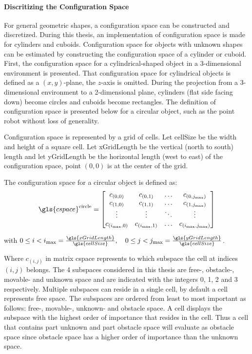 \paragraph{Discritizing the Configuration Space}
For general geometric shapes, a configuration space can be constructed and discretized. During this thesis, an implementation of configuration space is made for cylinders and cuboids. Configuration space for objects with unknown shapes can be estimated by constructing the configuration space of a cylinder or cuboid. First, the configuration space for a cylindrical-shaped object in a 3-dimensional environment is presented. That configuration space for cylindrical objects is defined as a $(x, y)$-plane, the $z$-axis is omitted. During the projection from a 3-dimensional environment to a 2-dimensional plane, cylinders (flat side facing down) become circles and cuboids become rectangles. The definition of configuration space is presented below for a circular object, such as the point robot without loss of generality.\bs

Configuration space is represented by a grid of cells. Let \gls{cellSize} be the width and height of a square cell. Let \gls{xGridLength} be the vertical (north to south) length and let \gls{yGridLength} be the horizontal length (west to east) of the configuration space, point $(0, 0)$ is at the center of the grid.\bs

The configuration space for a circular object is defined as:\bs
\[ \gls{cspace}^{\textrm{circle}} = 
\begin{bmatrix}
  c_{(0,0)} & c_{(0,1)} & \hdots & c_{(0,j_{\textrm{max}})}\\
  c_{(1,0)} & c_{(1,1)} & \hdots & c_{(1,j_{\textrm{max}})}\\
  \vdots &  \vdots & \ddots & \vdots\\
  c_{(i_{\textrm{max}},0)} & c_{(i_{\textrm{max}},1)} & \hdots & c_{(i_{\textrm{max}},j_{\textrm{max}})}\\
\end{bmatrix}
\]

with $0 \leq i < i_{\textrm{max}} = \frac{\gls{xGridLength}}{\gls{cellSize}}, \quad 0 \leq j < j_{\textrm{max}} = \frac{\gls{yGridLength}}{\gls{cellSize}}$.\bs

Where $c_{(i,j)}$ in matrix \gls{cspace} represents to which subspace the cell at indices $(i, j)$ belongs. The 4 subspaces considered in this thesis are free-, obstacle-, movable- and unknown space and are indicated with the integers 0, 1, 2 and 3 respectively. Multiple subspaces can reside in a single cell, by default a cell represents free space. The subspaces are ordered from least to most important as follows: free-, movable-, unknown- and obstacle space. A cell displays the subspace with the highest order of importance that resides in the cell. Thus a cell that contains part unknown and part obstacle space will evaluate as obstacle space since obstacle space has a higher order of importance than the unknown space.\bs

